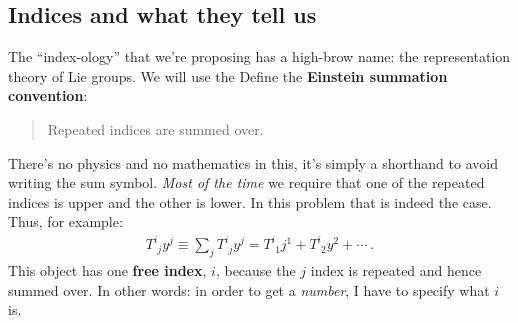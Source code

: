 \documentclass[12pt]{article}
\begin{document}








\subsection{Indices and what they tell us}

The ``index-ology'' that we're proposing has a high-brow name: the representation theory of Lie groups. We will use the Define the \textbf{Einstein summation convention}:
\begin{quote}
	Repeated indices are summed over. 
\end{quote}
 There's no physics and no mathematics in this, it's simply a shorthand to avoid writing the sum symbol. \emph{Most of the time} we require that one of the repeated indices is upper and the other is lower. In this problem that is indeed the case. Thus, for example:
 \begin{align}
 	T^{i}_{\phantom{i}j}y^j \equiv \sum_j T^{i}_{\phantom{i}j}y^j = T^{i}_{\phantom{i}1}j^1 + T^{i}_{\phantom{i}2}y^2 + \cdots \ .
 \end{align}
 This object has one \textbf{free index}, $i$, because the $j$ index is repeated and hence summed over. In other words: in order to get a \emph{number}, I have to specify what $i$ is. 
\end{document}
